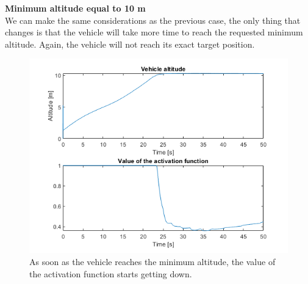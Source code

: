 \documentclass{article}
\begin{document}
{\large \textbf{Minimum altitude equal to 10 m}} \\
We can make the same considerations as the previous case, the only thing that changes is that the vehicle will take more time to reach the requested minimum altitude. Again, the vehicle will not reach its exact target position.
\begin{figure}[H]
	\centering
	\hspace{10mm}
	\label{fig:ex1.2.3_case10m_ab}
\end{figure}
\begin{figure}[H]
	\centering
	\includegraphics[scale=0.55]{images/Ex1/SafeNavigation_10m_AltAndActFunct}
	\caption{As soon as the vehicle reaches the minimum altitude, the value of the activation function starts getting down.}
	\label{fig:ex1.2.3_case10m_c}
\end{figure}
\end{document}
